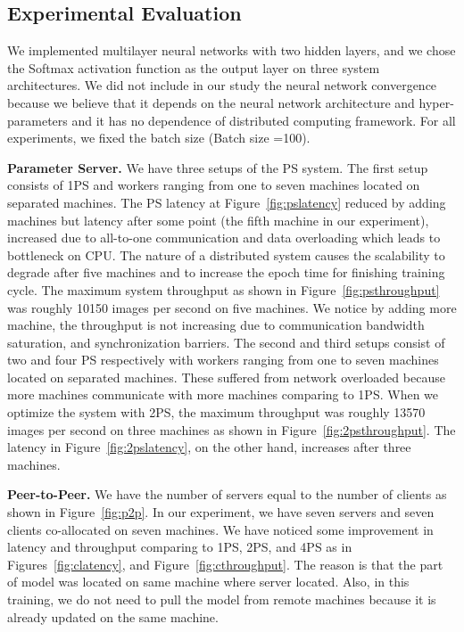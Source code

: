 \documentclass[conference]{IEEEtran}
\begin{document}
\subsection{Experimental Evaluation}

We implemented multilayer neural networks with two hidden layers, and we chose the Softmax activation function as the output layer on three system architectures. We did not include in our study the neural network convergence because we believe that it depends on the neural network architecture and hyper-parameters and it has no dependence of distributed computing framework. For all experiments, we fixed the batch size (Batch size =100). 

\textbf{Parameter Server.} We have three setups of the PS system. The first setup consists of 1PS and workers ranging from one to seven machines located on separated machines. The PS latency at Figure~\ref{fig:pslatency} reduced by adding machines but latency after some point (the fifth machine in our experiment), increased due to all-to-one communication and data overloading which leads to bottleneck on CPU. The nature of a distributed system causes the scalability to degrade after five machines and to increase the epoch time for finishing training cycle. The maximum system throughput as shown in Figure~\ref{fig:psthroughput} was roughly 10150 images per second on five machines. We notice by adding more machine, the throughput is not increasing due to communication bandwidth saturation, and synchronization barriers. The second and third setups consist of two and four PS respectively with workers ranging from one to seven machines located on separated machines. These suffered from network overloaded because more machines communicate with more machines comparing to 1PS. When we optimize the system with 2PS, the maximum throughput was roughly 13570 images per second on three machines as shown in Figure~\ref{fig:2psthroughput}. The latency in Figure~\ref{fig:2pslatency}, on the other hand, increases after three machines. 

\textbf{Peer-to-Peer.} We have the number of servers equal to the number of clients as shown in Figure~\ref{fig:p2p}. In our experiment, we have seven servers and seven clients co-allocated on seven machines. We have noticed some improvement in latency and throughput comparing to 1PS, 2PS, and 4PS as in Figures~\ref{fig:clatency}, and Figure~\ref{fig:cthroughput}. The reason is that the part of model was located on same machine where server located. Also, in this training, we do not need to pull the model from remote machines because it is already updated on the same machine. 
\end{document}
